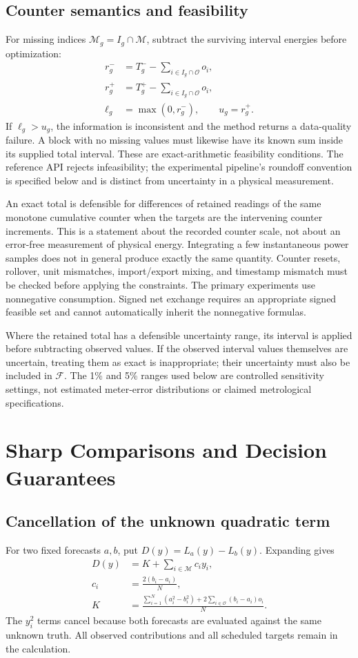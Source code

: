 \documentclass[12pt]{article}
\newcommand{\F}{\mathcal{F}}
\newcommand{\M}{\mathcal{M}}
\newcommand{\Oset}{\mathcal{O}}
\begin{document}
\subsection{Counter semantics and feasibility}
For missing indices $\M_g=I_g\cap\M$, subtract the surviving interval
energies before optimization:
\begin{align}
 r_g^-&=T_g^- -\sum_{i\in I_g\cap\Oset}o_i,\\
 r_g^+&=T_g^+ -\sum_{i\in I_g\cap\Oset}o_i,\\
 \ell_g&=\max(0,r_g^-),\qquad u_g=r_g^+.
 \label{eq:residual}
\end{align}
If $\ell_g>u_g$, the information is inconsistent and the method returns a
data-quality failure. A block with no missing values must likewise have its
known sum inside its supplied total interval. These are exact-arithmetic
feasibility conditions. The reference API rejects infeasibility; the
experimental pipeline's roundoff convention is specified below and is
distinct from uncertainty in a physical measurement.

An exact total is defensible for differences of retained readings of the
same monotone cumulative counter when the targets are the intervening
counter increments. This is a statement about the recorded counter scale,
not about an error-free measurement of physical energy. Integrating a few
instantaneous power samples does not in general produce exactly the same
quantity. Counter resets, rollover, unit mismatches, import/export mixing,
and timestamp mismatch must be checked before applying the constraints.
The primary experiments use nonnegative consumption. Signed net exchange
requires an appropriate signed feasible set and cannot automatically inherit
the nonnegative formulas.

Where the retained total has a defensible uncertainty range, its interval
is applied before subtracting observed values. If the observed interval
values themselves are uncertain, treating them as exact is inappropriate;
their uncertainty must also be included in $\F$. The 1\% and 5\% ranges
used below are controlled sensitivity settings, not estimated meter-error
distributions or claimed metrological specifications.

\section{Sharp Comparisons and Decision Guarantees}
\subsection{Cancellation of the unknown quadratic term}
For two fixed forecasts $a,b$, put $D(y)=L_a(y)-L_b(y)$. Expanding gives
\begin{align}
 D(y)&=K+\sum_{i\in\M}c_i y_i,\label{eq:linear}\\
 c_i&=\frac{2(b_i-a_i)}{N},\\
 K&=\frac{\sum_{i=1}^N(a_i^2-b_i^2)
       +2\sum_{i\in\Oset}(b_i-a_i)o_i}{N}.
\end{align}
The $y_i^2$ terms cancel because both forecasts are evaluated against the
same unknown truth. All observed contributions and all scheduled targets
remain in the calculation.
\end{document}
